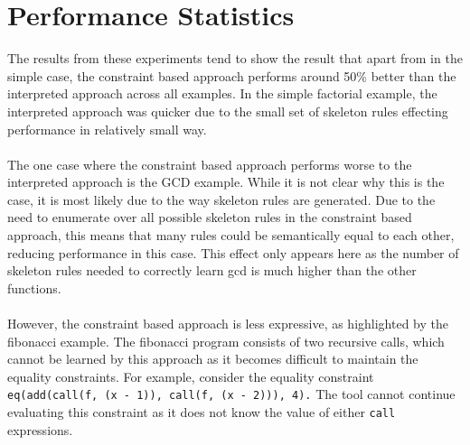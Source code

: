 \section{Performance Statistics}
The results from these experiments tend to show the result that apart from in the simple case, the constraint based approach performs around 50\% better than the interpreted approach across all examples. In the simple factorial example, the interpreted approach was quicker due to the small set of skeleton rules effecting performance in relatively small way. \\ \\
The one case where the constraint based approach performs worse to the interpreted approach is the GCD example. While it is not clear why this is the case, it is most likely due to the way skeleton rules are generated. Due to the need to enumerate over all possible skeleton rules in the constraint based approach, this means that many rules could be semantically equal to each other, reducing performance in this case. This effect only appears here as the number of skeleton rules needed to correctly learn gcd is much higher than the other functions. \\ \\
However, the constraint based approach is less expressive, as highlighted by the fibonacci example. The fibonacci program consists of two recursive calls, which cannot be learned by this approach as it becomes difficult to maintain the equality constraints. For example, consider the equality constraint \lstinline{eq(add(call(f, (x - 1)), call(f, (x - 2))), 4).} The tool cannot continue evaluating this constraint as it does not know the value of either \lstinline{call} expressions.%

\pagebreak

